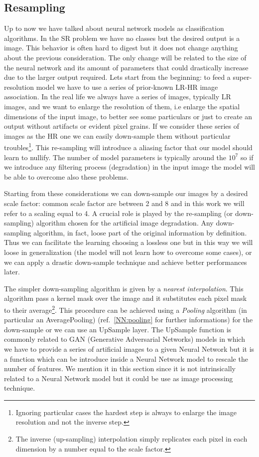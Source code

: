 \documentclass{standalone}
\begin{document}
\subsection[Resampling]{Resampling}\label{SR:downsampling}

Up to now we have talked about neural network models as classification algorithms.
In the SR problem we have no classes but the desired output is a image.
This behavior is often hard to digest but it does not change anything about the previous consideration.
The only change will be related to the size of the neural network and its amount of parameters that could drastically increase due to the larger output required.
Lets start from the beginning: to feed a super-resolution model we have to use a series of prior-known LR-HR image association.
In the real life we always have a series of images, typically LR images, and we want to enlarge the resolution of them, i.e enlarge the spatial dimensions of the input image, to better see some particulars or just to create an output without artifacts or evident pixel grains.
If we consider these series of images as the HR one we can easily down-sample them without particular troubles\footnote{
  Ignoring particular cases the hardest step is always to enlarge the image resolution and not the inverse step.
}.
This re-sampling will introduce a aliasing factor that our model should learn to nullify.
The number of model parameters is typically around the $10^7$ so if we introduce any filtering process (degradation) in the input image the model will be able to overcome also these problems.

Starting from these considerations we can down-sample our images by a desired scale factor: common scale factor are between 2 and 8 and in this work we will refer to a scaling equal to 4.
A crucial role is played by the re-sampling (or down-sampling) algorithm chosen for the artificial image degradation.
Any down-sampling algorithm, in fact, loose part of the original information by definition.
Thus we can facilitate the learning choosing a lossless one but in this way we will loose in generalization (the model will not learn how to overcome some cases), or we can apply a drastic down-sample technique and achieve better performances later.

The simpler down-sampling algorithm is given by a \emph{nearest interpolation}.
This algorithm pass a kernel mask over the image and it substitutes each pixel mask to their average\footnote{
  The inverse (up-sampling) interpolation simply replicates each pixel in each dimension by a number equal to the scale factor.
}.
This procedure can be achieved using a \emph{Pooling} algorithm (in particular an AveragePooling) (ref.~\ref{NN:pooling} for further informations) for the down-sample or we can use an UpSample layer.
The UpSample function is commonly related to GAN (Generative Adversarial Networks) models in which we have to provide a series of artificial images to a given Neural Network but it is a function which can be introduce inside a Neural Network model to rescale the number of features.
We mention it in this section since it is not intrinsically related to a Neural Network model but it could be use as image processing technique.
\end{document}
